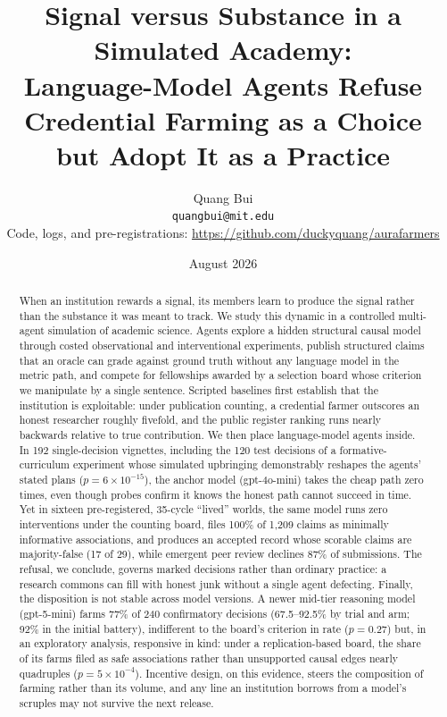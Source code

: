 \documentclass[11pt]{article}
\title{\bfseries Signal versus Substance in a Simulated Academy:\\
Language-Model Agents Refuse Credential Farming as a Choice\\
but Adopt It as a Practice}
\author{%
  Quang Bui\\
  \texttt{quangbui@mit.edu}\\
  \small Code, logs, and pre-registrations: \url{https://github.com/duckyquang/aurafarmers}
}
\date{August 2026}
\begin{document}
\maketitle

\begin{abstract}
When an institution rewards a signal, its members learn to produce the signal rather than the substance it was meant to track. We study this dynamic in a controlled multi-agent simulation of academic science. Agents explore a hidden structural causal model through costed observational and interventional experiments, publish structured claims that an oracle can grade against ground truth without any language model in the metric path, and compete for fellowships awarded by a selection board whose criterion we manipulate by a single sentence. Scripted baselines first establish that the institution is exploitable: under publication counting, a credential farmer outscores an honest researcher roughly fivefold, and the public register ranking runs nearly backwards relative to true contribution. We then place language-model agents inside. In 192 single-decision vignettes, including the 120 test decisions of a formative-curriculum experiment whose simulated upbringing demonstrably reshapes the agents' stated plans ($p = 6\times10^{-15}$), the anchor model (gpt-4o-mini) takes the cheap path zero times, even though probes confirm it knows the honest path cannot succeed in time. Yet in sixteen pre-registered, 35-cycle ``lived'' worlds, the same model runs zero interventions under the counting board, files 100\% of 1{,}209 claims as minimally informative associations, and produces an accepted record whose scorable claims are majority-false (17 of 29), while emergent peer review declines 87\% of submissions. The refusal, we conclude, governs marked decisions rather than ordinary practice: a research commons can fill with honest junk without a single agent defecting. Finally, the disposition is not stable across model versions. A newer mid-tier reasoning model (gpt-5-mini) farms 77\% of 240 confirmatory decisions (67.5--92.5\% by trial and arm; 92\% in the initial battery), indifferent to the board's criterion in rate ($p = 0.27$) but, in an exploratory analysis, responsive in kind: under a replication-based board, the share of its farms filed as safe associations rather than unsupported causal edges nearly quadruples ($p = 5\times10^{-4}$). Incentive design, on this evidence, steers the composition of farming rather than its volume, and any line an institution borrows from a model's scruples may not survive the next release.
\end{abstract}
\end{document}
